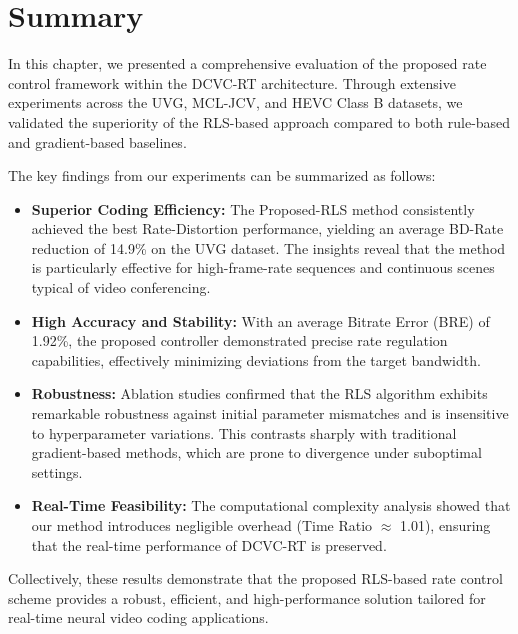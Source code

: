 \section{Summary}

In this chapter, we presented a comprehensive evaluation of the proposed rate control framework within the DCVC-RT architecture. Through extensive experiments across the UVG, MCL-JCV, and HEVC Class B datasets, we validated the superiority of the RLS-based approach compared to both rule-based and gradient-based baselines.

The key findings from our experiments can be summarized as follows:
\begin{itemize}
    \item \textbf{Superior Coding Efficiency:} The Proposed-RLS method consistently achieved the best Rate-Distortion performance, yielding an average BD-Rate reduction of 14.9\% on the UVG dataset. The insights reveal that the method is particularly effective for high-frame-rate sequences and continuous scenes typical of video conferencing.
    \item \textbf{High Accuracy and Stability:} With an average Bitrate Error (BRE) of 1.92\%, the proposed controller demonstrated precise rate regulation capabilities, effectively minimizing deviations from the target bandwidth.
    \item \textbf{Robustness:} Ablation studies confirmed that the RLS algorithm exhibits remarkable robustness against initial parameter mismatches and is insensitive to hyperparameter variations. This contrasts sharply with traditional gradient-based methods, which are prone to divergence under suboptimal settings.
    \item \textbf{Real-Time Feasibility:} The computational complexity analysis showed that our method introduces negligible overhead (Time Ratio $\approx$ 1.01), ensuring that the real-time performance of DCVC-RT is preserved.
\end{itemize}

Collectively, these results demonstrate that the proposed RLS-based rate control scheme provides a robust, efficient, and high-performance solution tailored for real-time neural video coding applications.